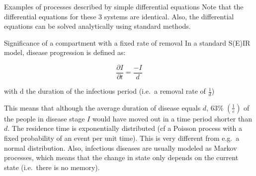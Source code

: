 \documentclass[
  ignorenonframetext,
]{beamer}
\begin{document}
\begin{frame}{Examples of processes described by simple differential
equations}
Note that the differential equations for these 3 systems are identical.
Also, the differential equations can be solved analytically using
standard methods.
\end{frame}

\begin{frame}{Significance of a compartment with a fixed rate of
removal}
\protect\hypertarget{significance-of-a-compartment-with-a-fixed-rate-of-removal}{}
In a standard S(E)IR model, disease progression is defined as:

\[\frac{\partial I}{\partial t} = \frac{-I}{d}\]

with d the duration of the infectious period (i.e.~a removal rate of
\(\frac 1 d\))

This means that although the average duration of disease equals \(d\),
\(63 \%\) \(\left (\frac 1 e \right)\) of the people in disease stage
\(I\) would have moved out in a time period shorter than \(d\). The
residence time is exponentially distributed (cf a Poisson process with a
fixed probability of an event per unit time). This is very different
from e.g.~a normal distribution. Also, infectious diseases are usually
modeled as Markov processes, which means that the change in state only
depends on the current state (i.e.~there is no memory).
\end{frame}
\end{document}
